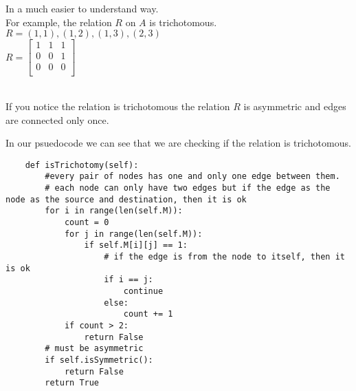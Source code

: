 In a much easier to understand way. \\
For example, the relation $R$ on $A$ is trichotomous. \\

$R = {(1,1),(1,2),(1,3),(2,3)}$ \\ 

$R = \begin{bmatrix}
    1 & 1 & 1 \\
    0 & 0 & 1 \\
    0 & 0 & 0 \\
\end{bmatrix}$ \\

 \\

If you notice the relation is trichotomous the relation $R$ is asymmetric and edges are connected only once.

In our psuedocode we can see that we are checking if the relation is trichotomous. \\
\begin{lstlisting}
    def isTrichotomy(self):
        #every pair of nodes has one and only one edge between them.                 
        # each node can only have two edges but if the edge as the node as the source and destination, then it is ok
        for i in range(len(self.M)):
            count = 0
            for j in range(len(self.M)):
                if self.M[i][j] == 1:
                    # if the edge is from the node to itself, then it is ok
                    if i == j:
                        continue
                    else:
                        count += 1
            if count > 2:
                return False
        # must be asymmetric
        if self.isSymmetric():
            return False            
        return True
\end{lstlisting}



